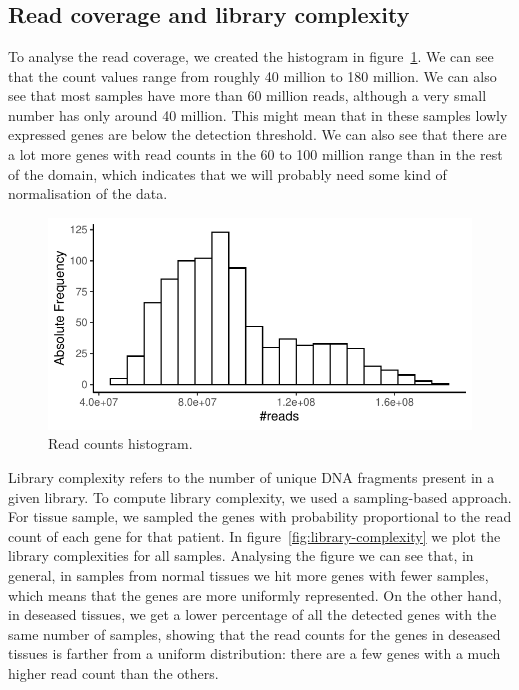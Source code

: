 \documentclass[10pt,twocolumn]{article}\usepackage[]{graphicx}\usepackage[]{color}
\makeatletter
\def\maxwidth{ %
  \ifdim\Gin@nat@width>\linewidth
    \linewidth
  \else
    \Gin@nat@width
  \fi
}
\newenvironment{knitrout}{}{} %
\makeatother
\begin{document}
\section{}

\subsection{Read coverage and library complexity}
To analyse the read coverage, we created the histogram in figure~\ref{fig:read-coverage}. We can see that the count values range from roughly 40 million to 180 million.
We can also see that most samples have more than 60 million reads, although a very small number has only around 40 million.
This might mean that in these samples lowly expressed genes are below the detection threshold. We can also see that there are a lot more genes with read counts in the 60 to 100 million range than in the rest of the domain, which indicates that we will probably need some kind of normalisation of the data.

\begin{knitrout}
\color{fgcolor}\begin{figure}[ht]

{\centering \includegraphics[width=\maxwidth]{figure/read-coverage-1} 

}

\caption[Read counts histogram]{Read counts histogram.}\label{fig:read-coverage}
\end{figure}


\end{knitrout}

Library complexity refers to the number of unique DNA fragments present in a given library. To compute library complexity, we used a sampling-based approach. For tissue sample, we sampled the genes with probability proportional to the read count of each gene for that patient. In figure~\ref{fig:library-complexity} we plot the library complexities for all samples.
Analysing the figure we can see that, in general, in samples from normal tissues we hit more genes with fewer samples, which means that the genes are more uniformly represented. On the other hand, in deseased tissues, we get a lower percentage of all the detected genes with the same number of samples, showing that the read counts for the genes in deseased tissues is farther from a uniform distribution: there are a few genes with a much higher read count than the others.
\end{document}
